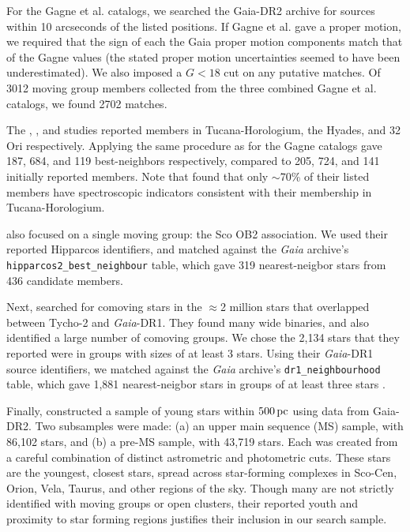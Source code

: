 \documentclass[12pt,twocolumn,tighten]{aastex62}
\begin{document}
For the Gagne et al{.} catalogs, we searched the Gaia-DR2 archive for
sources within 10 arcseconds of the listed positions.  If Gagne et
al{.} gave a proper motion, we required that the sign of each the Gaia
proper motion components match that of the Gagne values (the stated
proper motion uncertainties seemed to have been underestimated).  We
also imposed a $G<18$ cut on any putative matches.  Of 3012 moving
group members collected from the three combined Gagne et al{.}
catalogs, we found 2702 matches.

The \citet{kraus_tucanahor_2014}, \citet{roser_deep_2011}, and
\citet{bell_32ori_2017} studies reported members in Tucana-Horologium,
the Hyades, and 32$\,$Ori respectively.  Applying the same procedure as
for the Gagne catalogs gave 187, 684, and 119 best-neighbors
respectively, compared to 205, 724, and 141 initially reported
members.  Note that \citet{kraus_tucanahor_2014} found that only
$\sim$70\% of their listed members have spectroscopic indicators
consistent with their membership in Tucana-Horologium.

\citet{rizzuto_multidimensional_2011} also focused on a single moving
group: the Sco OB2 association. We used their reported Hipparcos
identifiers, and matched against the {\it Gaia} archive's
\texttt{hipparcos2\_best\_neighbour} table, which gave 319
nearest-neigbor stars from 436 candidate members.

Next, \citet{oh_comoving_2017} searched for comoving stars in the
$\approx$2 million stars that overlapped between Tycho-2 and {\it
Gaia}-DR1.  They found many wide binaries, and also identified a large
number of comoving groups.  We chose the 2{,}134 stars that they
reported were in groups with sizes of at least 3 stars.  Using their
{\it Gaia}-DR1 source identifiers, we matched against the {\it Gaia}
archive's \texttt{dr1\_neighbourhood} table, which gave 1{,}881
nearest-neigbor stars in groups of at least three stars
\citep{marrese_gaia_2019}.

Finally, \citet{zari_3d_2018} constructed a sample of young stars
within $500\,{\rm pc}$ using data from Gaia-DR2. Two subsamples were
made: (a) an upper main sequence (MS) sample, with 86{,}102 stars, and
(b) a pre-MS sample, with 43{,}719 stars.  Each was created from a
careful combination of distinct astrometric and photometric cuts.
These stars are the youngest, closest stars, spread across
star-forming complexes in Sco-Cen, Orion, Vela, Taurus, and other
regions of the sky.  Though many are not strictly identified with
moving groups or open clusters, their reported youth and proximity to star
forming regions justifies their inclusion in our search sample.
\end{document}
